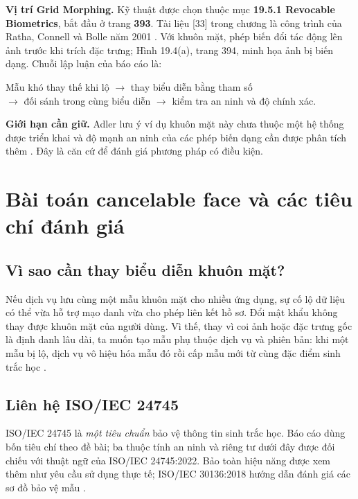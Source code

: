 \documentclass[11pt,a4paper]{article}
\begin{document}
\textbf{Vị trí Grid Morphing.} Kỹ thuật được chọn thuộc mục \textbf{19.5.1 Revocable Biometrics}, bắt đầu ở trang \textbf{393}. Tài liệu [33] trong chương là công trình của Ratha, Connell và Bolle năm 2001 \cite{ratha}. Với khuôn mặt, phép biến đổi tác động lên ảnh trước khi trích đặc trưng; Hình 19.4(a), trang 394, minh họa ảnh bị biến dạng. Chuỗi lập luận của báo cáo là:
\begin{center}
\small Mẫu khó thay thế khi lộ $\longrightarrow$ thay biểu diễn bằng tham số\\
$\longrightarrow$ đối sánh trong cùng biểu diễn $\longrightarrow$ kiểm tra an ninh và độ chính xác.
\end{center}
\textbf{Giới hạn cần giữ.} Adler lưu ý ví dụ khuôn mặt này chưa thuộc một hệ thống được triển khai và độ mạnh an ninh của các phép biến dạng cần được phân tích thêm \cite[tr.~394--395]{adler}. Đây là căn cứ để đánh giá phương pháp có điều kiện.

\newpage
\section{Bài toán cancelable face và các tiêu chí đánh giá}
\subsection{Vì sao cần thay biểu diễn khuôn mặt?}
Nếu dịch vụ lưu cùng một mẫu khuôn mặt cho nhiều ứng dụng, sự cố lộ dữ liệu có thể vừa hỗ trợ mạo danh vừa cho phép liên kết hồ sơ. Đổi mật khẩu không thay được khuôn mặt của người dùng. Vì thế, thay vì coi ảnh hoặc đặc trưng gốc là định danh lâu dài, ta muốn tạo mẫu phụ thuộc dịch vụ và phiên bản: khi một mẫu bị lộ, dịch vụ vô hiệu hóa mẫu đó rồi cấp mẫu mới từ cùng đặc điểm sinh trắc học \cite[tr.~383, 393--395]{adler}.

\subsection{Liên hệ ISO/IEC 24745}
ISO/IEC 24745 là \emph{một tiêu chuẩn} bảo vệ thông tin sinh trắc học. Báo cáo dùng bốn tiêu chí theo đề bài; ba thuộc tính an ninh và riêng tư dưới đây được đối chiếu với thuật ngữ của ISO/IEC 24745:2022. Bảo toàn hiệu năng được xem thêm như yêu cầu sử dụng thực tế; ISO/IEC 30136:2018 hướng dẫn đánh giá các sơ đồ bảo vệ mẫu \cite{iso2022,iso30136}.
\end{document}
